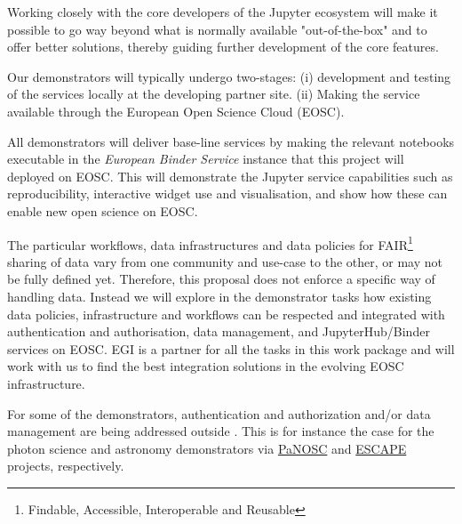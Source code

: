 \begin{workpackage}
\begin{wpdescription}
  Working closely with the core developers of the Jupyter ecosystem will make it possible to 
  go way beyond what is normally available "out-of-the-box" and to offer better solutions, 
  thereby guiding further development of the core features.

  \medskip
  Our demonstrators will typically undergo two-stages: (i)
  development and testing of the services locally at the developing partner 
  site. (ii) Making the service available through the European Open 
  Science Cloud (EOSC).

  All demonstrators will deliver base-line services by making the
  relevant notebooks executable in the \emph{European Binder Service} instance that this
  project will deployed on EOSC. This will demonstrate
  the Jupyter service capabilities such as reproducibility, interactive
  widget use and visualisation, and show how these can
  enable new open science on EOSC.

  The particular workflows, data infrastructures and data policies for
  FAIR\footnote{Findable, Accessible, Interoperable and Reusable} sharing of data vary from one community and use-case to
  the other, or may not be fully defined yet. Therefore, this proposal
  does not enforce a specific way of handling data. Instead we
  will explore in the demonstrator tasks how existing data policies,
  infrastructure and workflows can be respected and integrated with
  authentication and authorisation, data management, and
  JupyterHub/Binder services on EOSC. EGI is a partner
  for all the tasks in this work package and will work with us to find the
  best integration solutions in the evolving EOSC
  infrastructure.

  For some of the demonstrators, authentication and authorization and/or
  data management are being addressed outside \TheProject.
  This is for instance the case for the photon science and astronomy
  demonstrators via \href{https://panosc-eu.github.io/}{PaNOSC} and 
  \href{https://www.eso.org/public/announcements/ann18084/}{ESCAPE} projects, respectively.
  
\end{wpdescription}

\begin{tasklist}
% 







\end{tasklist}




\end{workpackage}
